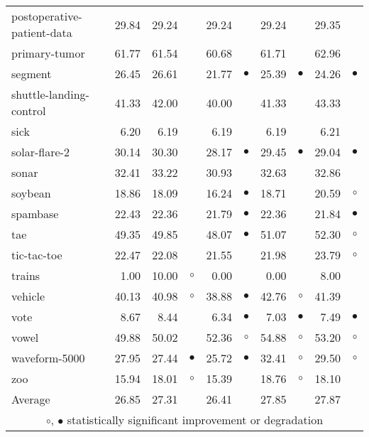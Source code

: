 \begin{table}[thb]
{\begin{tabular}{lrr@{\hspace{0.1cm}}cr@{\hspace{0.1cm}}cr@{\hspace{0.1cm}}cr@{\hspace{0.1cm}}c}
postoperative-patient-data & 29.84 & 29.24 &           & 29.24 &           & 29.24 &           & 29.35 &          \\
primary-tumor & 61.77 & 61.54 &           & 60.68 &           & 61.71 &           & 62.96 &          \\
segment & 26.45 & 26.61 &           & 21.77 & $\bullet$ & 25.39 & $\bullet$ & 24.26 & $\bullet$\\
shuttle-landing-control & 41.33 & 42.00 &           & 40.00 &           & 41.33 &           & 43.33 &          \\
sick &  6.20 &  6.19 &           &  6.19 &           &  6.19 &           &  6.21 &          \\
solar-flare-2 & 30.14 & 30.30 &           & 28.17 & $\bullet$ & 29.45 & $\bullet$ & 29.04 & $\bullet$\\
sonar & 32.41 & 33.22 &           & 30.93 &           & 32.63 &           & 32.86 &          \\
soybean & 18.86 & 18.09 &           & 16.24 & $\bullet$ & 18.71 &           & 20.59 &   $\circ$\\
spambase & 22.43 & 22.36 &           & 21.79 & $\bullet$ & 22.36 &           & 21.84 & $\bullet$\\
tae & 49.35 & 49.85 &           & 48.07 & $\bullet$ & 51.07 &           & 52.30 &   $\circ$\\
tic-tac-toe & 22.47 & 22.08 &           & 21.55 &           & 21.98 &           & 23.79 &   $\circ$\\
trains &  1.00 & 10.00 &   $\circ$ &  0.00 &           &  0.00 &           &  8.00 &          \\
vehicle & 40.13 & 40.98 &   $\circ$ & 38.88 & $\bullet$ & 42.76 &   $\circ$ & 41.39 &          \\
vote &  8.67 &  8.44 &           &  6.34 & $\bullet$ &  7.03 & $\bullet$ &  7.49 & $\bullet$\\
vowel & 49.88 & 50.02 &           & 52.36 &   $\circ$ & 54.88 &   $\circ$ & 53.20 &   $\circ$\\
waveform-5000 & 27.95 & 27.44 & $\bullet$ & 25.72 & $\bullet$ & 32.41 &   $\circ$ & 29.50 &   $\circ$\\
zoo & 15.94 & 18.01 &   $\circ$ & 15.39 &           & 18.76 &   $\circ$ & 18.10 &          \\
\hline
Average & 26.85 & 27.31 &           & 26.41 &           & 27.85 &           & 27.87 &          \\
\hline
\multicolumn{10}{c}{$\circ$, $\bullet$ statistically significant improvement or degradation}\\
\end{tabular} \footnotesize \par}
\end{table}